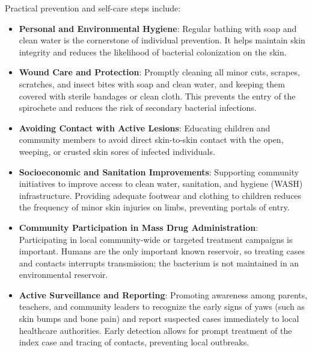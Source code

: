 Practical prevention and self-care steps include:
\begin{itemize}
    \item \textbf{Personal and Environmental Hygiene}: Regular bathing with soap and clean water is the cornerstone of individual prevention. It helps maintain skin integrity and reduces the likelihood of bacterial colonization on the skin.
    \item \textbf{Wound Care and Protection}: Promptly cleaning all minor cuts, scrapes, scratches, and insect bites with soap and clean water, and keeping them covered with sterile bandages or clean cloth. This prevents the entry of the spirochete and reduces the risk of secondary bacterial infections.
    \item \textbf{Avoiding Contact with Active Lesions}: Educating children and community members to avoid direct skin-to-skin contact with the open, weeping, or crusted skin sores of infected individuals.
    \item \textbf{Socioeconomic and Sanitation Improvements}: Supporting community initiatives to improve access to clean water, sanitation, and hygiene (WASH) infrastructure. Providing adequate footwear and clothing to children reduces the frequency of minor skin injuries on limbs, preventing portals of entry.
    \item \textbf{Community Participation in Mass Drug Administration}: Participating in local community-wide or targeted treatment campaigns is important. Humans are the only important known reservoir, so treating cases and contacts interrupts transmission; the bacterium is not maintained in an environmental reservoir.
    \item \textbf{Active Surveillance and Reporting}: Promoting awareness among parents, teachers, and community leaders to recognize the early signs of yaws (such as skin bumps and bone pain) and report suspected cases immediately to local healthcare authorities. Early detection allows for prompt treatment of the index case and tracing of contacts, preventing local outbreaks.
\end{itemize}

